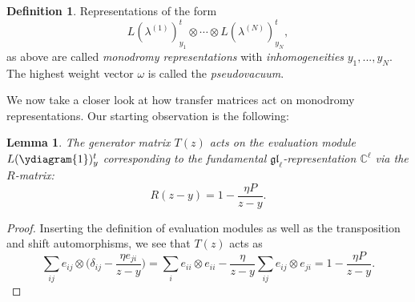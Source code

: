 \documentclass[11pt]{report}
\newtheorem{lemma}[theorem]{Lemma}
\theoremstyle{definition}
\newtheorem{definition}[theorem]{Definition}
\theoremstyle{remark}
\theoremstyle{remark}
\newcommand{\C}{\mathbb{C}}
\begin{document}
\begin{definition}
Representations of the form
\begin{equation*}
L(\lambda^{(1)})_{y_1}^t \otimes \cdots \otimes L(\lambda^{(N)})_{y_N}^t,
\end{equation*}
as above are called \emph{monodromy representations} with \emph{inhomogeneities} $y_1,...,y_N$. The highest weight vector $\omega$ is called the \emph{pseudovacuum}. 
\end{definition}

We now take a closer look at how transfer matrices act on monodromy representations. Our starting observation is the following:

\begin{lemma}
The generator matrix $T(z)$ acts on the evaluation module $L(\ydiagram{1})_y^t$ corresponding to the fundamental $\mathfrak{gl}_\ell$-representation $\C^\ell$ via the $R$-matrix:
\begin{equation*}
R(z-y) = 1 - \frac{\eta P}{z-y}.
\end{equation*}
\end{lemma}

\begin{proof}
Inserting the definition of evaluation modules as well as the transposition and shift automorphisms, we see that $T(z)$ acts as
\begin{equation*}
\sum_{ij} e_{ij} \otimes \bigg( \delta_{ij} - \frac{\eta e_{ji}}{z-y} \bigg)
= \sum_{i} e_{ii} \otimes e_{ii} - \frac{\eta}{z-y} \sum_{ij} e_{ij} \otimes e_{ji} = 1 - \frac{\eta P}{z-y}.
\end{equation*}
\end{proof}
\end{document}
